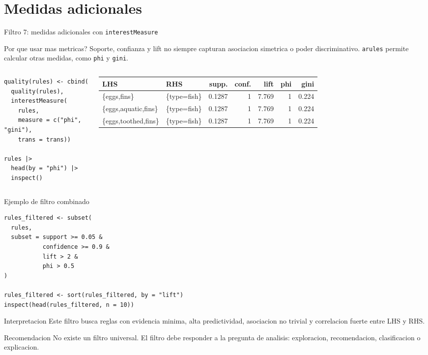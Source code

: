 \documentclass[10pt,aspectratio=169]{beamer}
\begin{document}
\section{Medidas adicionales}
\begin{frame}[fragile]{Filtro 7: medidas adicionales con \texttt{interestMeasure}}
\begin{block}{Por que usar mas metricas?}
Soporte, confianza y lift no siempre capturan asociacion simetrica o poder discriminativo. \texttt{arules} permite calcular otras medidas, como \texttt{phi} y \texttt{gini}.
\end{block}

\begin{columns}[T]
\begin{lstlisting}[style=rcode]
quality(rules) <- cbind(
  quality(rules),
  interestMeasure(
    rules,
    measure = c("phi", "gini"),
    trans = trans))

rules |>
  head(by = "phi") |>
  inspect()
\end{lstlisting}

\scriptsize
\begin{tabular}{llrrrrr}
\toprule
LHS & RHS & supp. & conf. & lift & phi & gini \\
\midrule
\{eggs,fins\} & \{type=fish\} & 0.1287 & 1 & 7.769 & 1 & 0.224 \\
\{eggs,aquatic,fins\} & \{type=fish\} & 0.1287 & 1 & 7.769 & 1 & 0.224 \\
\{eggs,toothed,fins\} & \{type=fish\} & 0.1287 & 1 & 7.769 & 1 & 0.224 \\
\bottomrule
\end{tabular}
\end{columns}
\end{frame}

\begin{frame}[fragile]{Ejemplo de filtro combinado}
\begin{lstlisting}[style=rcode]
rules_filtered <- subset(
  rules,
  subset = support >= 0.05 &
           confidence >= 0.9 &
           lift > 2 &
           phi > 0.5
)

rules_filtered <- sort(rules_filtered, by = "lift")
inspect(head(rules_filtered, n = 10))
\end{lstlisting}

\begin{block}{Interpretacion}
Este filtro busca reglas con evidencia minima, alta predictividad, asociacion no trivial y correlacion fuerte entre LHS y RHS.
\end{block}

\begin{alertblock}{Recomendacion}
No existe un filtro universal. El filtro debe responder a la pregunta de analisis: exploracion, recomendacion, clasificacion o explicacion.
\end{alertblock}
\end{frame}
\end{document}

